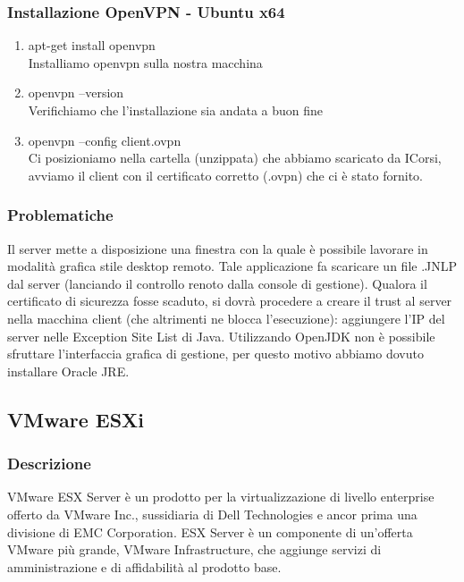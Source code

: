 \documentclass{article}
\begin{document}
\subsubsection{Installazione OpenVPN - Ubuntu x64}
\begin{enumerate}
    \item apt-get install openvpn \\ 
    Installiamo openvpn sulla nostra macchina
    \item openvpn --version \\
    Verifichiamo che l'installazione sia andata a buon fine
    \item openvpn --config client.ovpn \\
    Ci posizioniamo nella cartella (unzippata) che abbiamo scaricato da ICorsi,
    avviamo il client con il certificato corretto (.ovpn) che ci è stato fornito.
\end{enumerate}

\subsubsection{Problematiche} 
    Il server mette a disposizione una finestra con la quale è possibile lavorare in modalità
    grafica stile desktop remoto. Tale applicazione fa scaricare un file .JNLP dal server
    (lanciando il controllo renoto dalla console di gestione). Qualora il certificato di
    sicurezza fosse scaduto, si dovrà procedere a creare il trust al server nella macchina
    client (che altrimenti ne blocca l’esecuzione): aggiungere l’IP del server nelle Exception
    Site List di Java. Utilizzando OpenJDK non è possibile sfruttare l'interfaccia grafica di gestione, per questo 
    motivo abbiamo dovuto installare Oracle JRE.

\subsection{VMware ESXi}
\subsubsection{Descrizione}
VMware ESX Server è un prodotto per la virtualizzazione di livello enterprise offerto da VMware Inc., sussidiaria di Dell Technologies e ancor prima una divisione di EMC Corporation. ESX Server è un componente di un'offerta VMware più grande, VMware Infrastructure, che aggiunge servizi di amministrazione e di affidabilità al prodotto base. 
\end{document}
